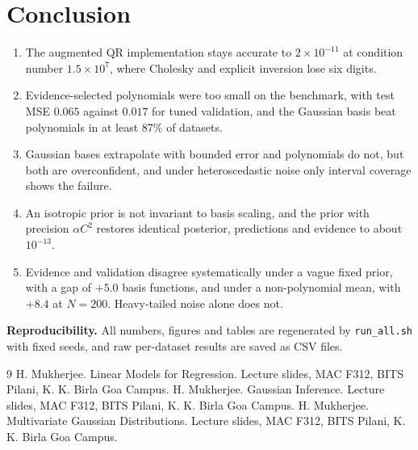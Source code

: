 \documentclass[10pt,a4paper]{article}
\begin{document}
\section{Conclusion}
\begin{enumerate}
\item The augmented QR implementation stays accurate to $2\times10^{-11}$ at condition number $1.5\times10^{7}$, where Cholesky and explicit inversion lose six digits.
\item Evidence-selected polynomials were too small on the benchmark, with test MSE $0.065$ against $0.017$ for tuned validation, and the Gaussian basis beat polynomials in at least 87\% of datasets.
\item Gaussian bases extrapolate with bounded error and polynomials do not, but both are overconfident, and under heteroscedastic noise only interval coverage shows the failure.
\item An isotropic prior is not invariant to basis scaling, and the prior with precision $\alpha C^2$ restores identical posterior, predictions and evidence to about $10^{-13}$.
\item Evidence and validation disagree systematically under a vague fixed prior, with a gap of $+5.0$ basis functions, and under a non-polynomial mean, with $+8.4$ at $N=200$. Heavy-tailed noise alone does not.
\end{enumerate}

\noindent\textbf{Reproducibility.} All numbers, figures and tables are regenerated by \texttt{run\_all.sh} with fixed seeds, and raw per-dataset results are saved as CSV files.

\begin{thebibliography}{9}\footnotesize
\setlength{\itemsep}{0pt}
 H. Mukherjee. Linear Models for Regression. Lecture slides, MAC F312, BITS Pilani, K. K. Birla Goa Campus.
 H. Mukherjee. Gaussian Inference. Lecture slides, MAC F312, BITS Pilani, K. K. Birla Goa Campus.
 H. Mukherjee. Multivariate Gaussian Distributions. Lecture slides, MAC F312, BITS Pilani, K. K. Birla Goa Campus.
\end{thebibliography}
\nocite{*}
\end{document}
